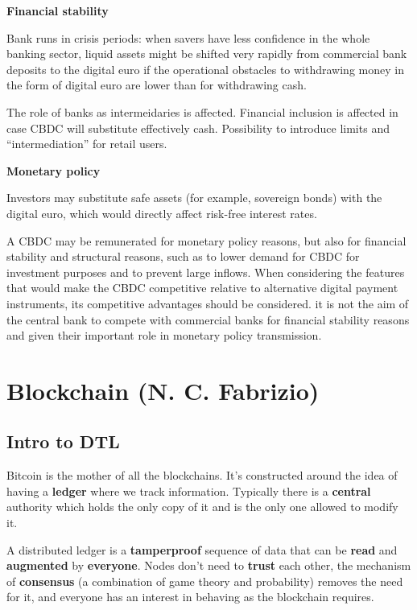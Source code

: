 \textbf{Financial stability}

Bank runs in crisis periods: when savers have less confidence in the whole banking sector, liquid assets might be shifted very rapidly from commercial bank deposits to the digital euro if the operational obstacles to withdrawing money in the form of digital euro are lower than for withdrawing cash.

The role of banks as intermeidaries is affected.
Financial inclusion is affected in case CBDC will substitute effectively cash.
Possibility to introduce limits and ``intermediation'' for retail users.

\textbf{Monetary policy}

Investors may substitute safe assets (for example, sovereign bonds) with the digital euro, which would directly affect risk-free interest rates.

A CBDC may be remunerated for monetary policy reasons, but also for financial stability and structural reasons, such as to lower demand for CBDC for investment purposes and to prevent large inflows.
When considering the features that would make the CBDC competitive relative to alternative digital payment instruments, its competitive advantages should be considered. it is not the aim of the central bank to compete with commercial banks for financial stability reasons and given their important role in monetary policy transmission.


\chapter{Blockchain (N. C. Fabrizio)}

\section{Intro to DTL}

Bitcoin is the mother of all the blockchains. It's constructed around the idea of having a \textbf{ledger} where we track information. Typically there is a \textbf{central} authority which holds the only copy of it and is the only one allowed to modify it.

A distributed ledger is a \textbf{tamperproof} sequence of data that can be \textbf{read} and \textbf{augmented} by \textbf{everyone}. Nodes don't need to \textbf{trust} each other, the mechanism of \textbf{consensus} (a combination of game theory and probability) removes the need for it, and everyone has an interest in behaving as the blockchain requires.

